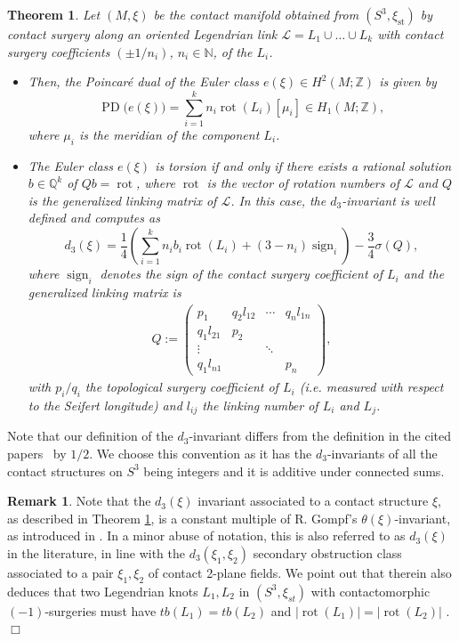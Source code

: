 \documentclass[11pt]{amsart} %
\DeclareMathOperator{\rot}{rot}
\newcommand{\Z}{\mathbb{Z}}
\newcommand{\Q}{\mathbb{Q}}
\newcommand{\N}{\mathbb{N}}
\newcommand{\xist}{\xi_{\mathrm{st}}}
\theoremstyle{plain}
\newtheorem{thm}[Theorem]{Theorem}
\theoremstyle{definition}
\newtheorem{rem}[Theorem]{Remark}
\begin{document}
\begin{thm}\label{computInv}
		Let $(M,\xi)$ be the contact manifold obtained from $(S^3,\xist)$ by contact surgery along an oriented Legendrian link $\mathcal{L}=L_1 \cup\ldots\cup L_k$ with contact surgery coefficients $(\pm 1/n_i)$, $n_i\in \N$, of the $L_i$.
		\begin{itemize}
			\item Then, the Poincar\'e dual of the Euler class $e(\xi)\in H^2(M;\Z)$ is given by
			\[
			\operatorname{PD}\big(e(\xi)\big)=\sum_{i=1}^k n_i\rot(L_i)[\mu_i] \in H_1(M;\Z),
			\]
			where $\mu_i$ is the meridian of the component $L_i$.\\
			\item The Euler class $e(\xi)$ is torsion if and only if there exists a rational solution $b\in \Q^k$ of $Qb = \rot$, where $\rot$ is the vector of rotation numbers of $\mathcal L$ and $Q$ is the generalized linking matrix of $\mathcal L$. In this case, the $d_3$-invariant is well defined and computes as
				\[
			d_3(\xi)= \frac 14 \left(\sum_{i=1}^k  n_i b_i \rot(L_i) +(3 -n_i) \operatorname{sign}_i
			\right) - \frac 34 \sigma(Q),  
			\]
			where $\operatorname{sign}_i$ denotes the sign of the contact surgery coefficient of $L_i$ and the generalized linking matrix is
			\begin{align*}
				Q:=\begin{pmatrix}
					p_1&q_2 l_{12} &\cdots&q_n l_{1n}\\
					q_1 l_{21} & p_2&&\\
					\vdots&&\ddots\\
					q_1 l_{n1}&&& p_n
				\end{pmatrix},
			\end{align*}	
		with $p_i/q_i$ the topological surgery coefficient of $L_i$ (i.e. measured with respect to the Seifert longitude) and $l_{ij}$ the linking number of $L_i$ and $L_j$.
		\end{itemize}
	\end{thm}

Note that our definition of the $d_3$-invariant differs from the definition in the cited papers~\cite{Gompf98,DingGeigesStipsicz04,DurstKegel16} by $1/2$. We choose this convention as it has the $d_3$-invariants of all the contact structures on $S^3$ being integers and it is additive under connected sums.

\begin{rem} Note that the $d_3(\xi)$ invariant associated to a contact structure $\xi$, as described in Theorem \ref{computInv}, is a constant multiple of R. Gompf's $\theta(\xi)$-invariant, as introduced in \cite[Section 4]{Gompf98}. In a minor abuse of notation, this is also referred to as $d_3(\xi)$ in the literature, in line with the $d_3(\xi_1,\xi_2)$ secondary obstruction class associated to a pair $\xi_1,\xi_2$ of contact 2-plane fields. We point out that \cite[Corollary 4.6]{Gompf98} therein also deduces that two Legendrian knots $L_1,L_2$ in $(S^3,\xi_{st})$ with contactomorphic $(-1)$-surgeries must have $tb(L_1)=tb(L_2)$ and $|\rot(L_1)|=|\rot(L_2)|$ .\hfill$\Box$
\end{rem}
\end{document}
